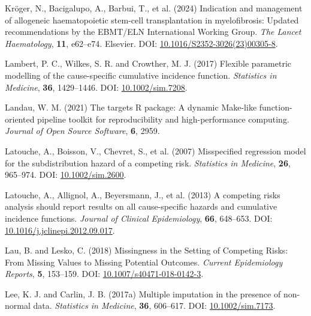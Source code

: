 \documentclass[
  letterpaper,
  paper=240mm:170mm,
  twoside=true,
  open=right,
  fontsize=10pt,
  pagesize=false,
  BCOR=15mm,
  DIV=14,
  headinclude=true,
  footinclude=false,
  headsepline=on]{scrbook}
\newlength{\cslhangindent}
\newenvironment{CSLReferences}[2] %
 {\begin{list}{}{%
  \setlength{\itemindent}{0pt}
  \setlength{\leftmargin}{0pt}
  \setlength{\parsep}{0pt}
  \ifodd #1
   \setlength{\leftmargin}{\cslhangindent}
   \setlength{\itemindent}{-1\cslhangindent}
  \fi
  \setlength{\itemsep}{#2\baselineskip}}}
 {\end{list}}
\begin{document}
\begin{CSLReferences}{1}{1}
Kröger, N., Bacigalupo, A., Barbui, T., et al. (2024) Indication and
management of allogeneic haematopoietic stem-cell transplantation in
myelofibrosis: Updated recommendations by the {EBMT}/{ELN International
Working Group}. \emph{The Lancet Haematology}, \textbf{11}, e62--e74.
Elsevier. DOI:
\href{https://doi.org/10.1016/S2352-3026(23)00305-8}{10.1016/S2352-3026(23)00305-8}.

Lambert, P. C., Wilkes, S. R. and Crowther, M. J. (2017) Flexible
parametric modelling of the cause-specific cumulative incidence
function. \emph{Statistics in Medicine}, \textbf{36}, 1429--1446. DOI:
\href{https://doi.org/10.1002/sim.7208}{10.1002/sim.7208}.

Landau, W. M. (2021) The targets {R} package: A dynamic {Make-like}
function-oriented pipeline toolkit for reproducibility and
high-performance computing. \emph{Journal of Open Source Software},
\textbf{6}, 2959.

Latouche, A., Boisson, V., Chevret, S., et al. (2007) Misspecified
regression model for the subdistribution hazard of a competing risk.
\emph{Statistics in Medicine}, \textbf{26}, 965--974. DOI:
\href{https://doi.org/10.1002/sim.2600}{10.1002/sim.2600}.

Latouche, A., Allignol, A., Beyersmann, J., et al. (2013) A competing
risks analysis should report results on all cause-specific hazards and
cumulative incidence functions. \emph{Journal of Clinical Epidemiology},
\textbf{66}, 648--653. DOI:
\href{https://doi.org/10.1016/j.jclinepi.2012.09.017}{10.1016/j.jclinepi.2012.09.017}.

Lau, B. and Lesko, C. (2018) Missingness in the {Setting} of {Competing
Risks}: From {Missing Values} to {Missing Potential Outcomes}.
\emph{Current Epidemiology Reports}, \textbf{5}, 153--159. DOI:
\href{https://doi.org/10.1007/s40471-018-0142-3}{10.1007/s40471-018-0142-3}.

Lee, K. J. and Carlin, J. B. (2017a) Multiple imputation in the presence
of non-normal data. \emph{Statistics in Medicine}, \textbf{36},
606--617. DOI:
\href{https://doi.org/10.1002/sim.7173}{10.1002/sim.7173}.


\end{CSLReferences}
\end{document}
